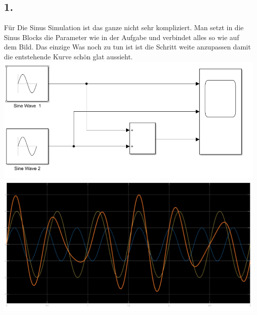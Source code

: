 \documentclass{scrartcl}
\begin{document}
\subsection*{1.}
Für Die Sinus Simulation ist das ganze nicht sehr kompliziert. Man setzt in die Sinus Blocks die Parameter wie in der Aufgabe und verbindet alles so wie auf dem Bild. Das einzige Was noch zu tun ist ist die Schritt weite anzupassen damit die entstehende Kurve schön glat aussieht.\\ 
\includegraphics[scale=0.6]{Sinussim.png}
\includegraphics[scale=0.47]{Sinusplot.png}\\
\end{document}

